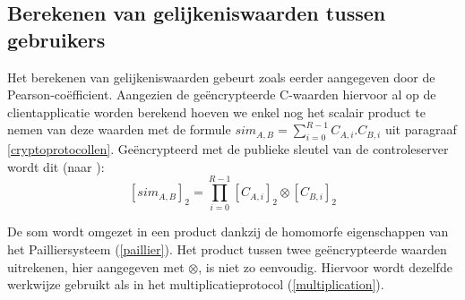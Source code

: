 \subsection{Berekenen van gelijkeniswaarden tussen gebruikers}
\label{similarities}

Het berekenen van gelijkeniswaarden gebeurt zoals eerder aangegeven door de Pearson-co\"efficient. Aangezien de ge\"encrypteerde C-waarden hiervoor al op de clientapplicatie worden berekend hoeven we enkel nog het scalair product te nemen van deze waarden met de formule $sim_{A,B} = \sum_{i=0}^{R-1} C_{A,i}.C_{B,i}$ uit paragraaf \ref{cryptoprotocollen}. Ge\"encrypteerd met de publieke sleutel van de controleserver wordt dit (naar \cite{ZErkinDyn}):
\begin{equation}\label{similarity}[sim_{A,B}]_2 = \prod_{i=0}^{R-1} [C_{A,i}]_2 \otimes [C_{B,i}]_2 \end{equation}

De som wordt omgezet in een product dankzij de homomorfe eigenschappen van het Pailliersysteem (\ref{paillier}). Het product tussen twee ge\"encrypteerde waarden uitrekenen, hier aangegeven met  $\otimes$, is niet zo eenvoudig. Hiervoor wordt dezelfde werkwijze gebruikt als in het multiplicatieprotocol (\ref{multiplication}).